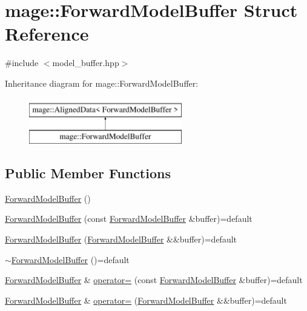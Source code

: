 \hypertarget{structmage_1_1_forward_model_buffer}{}\section{mage\+:\+:Forward\+Model\+Buffer Struct Reference}
\label{structmage_1_1_forward_model_buffer}


{\ttfamily \#include $<$model\+\_\+buffer.\+hpp$>$}

Inheritance diagram for mage\+:\+:Forward\+Model\+Buffer\+:\begin{figure}[H]
\begin{center}
\leavevmode
\includegraphics[height=2.000000cm]{structmage_1_1_forward_model_buffer}
\end{center}
\end{figure}
\subsection*{Public Member Functions}
\begin{DoxyCompactItemize}
\item 
\hyperlink{structmage_1_1_forward_model_buffer_ae9a1629205067c541dcc2d3f1964d8e2}{Forward\+Model\+Buffer} ()
\item 
\hyperlink{structmage_1_1_forward_model_buffer_a12c7548e793781896b51359801e7a274}{Forward\+Model\+Buffer} (const \hyperlink{structmage_1_1_forward_model_buffer}{Forward\+Model\+Buffer} \&buffer)=default
\item 
\hyperlink{structmage_1_1_forward_model_buffer_a5a78b1a5191445413692592e807514af}{Forward\+Model\+Buffer} (\hyperlink{structmage_1_1_forward_model_buffer}{Forward\+Model\+Buffer} \&\&buffer)=default
\item 
\hyperlink{structmage_1_1_forward_model_buffer_ac8785bc5a7d271ee2a39bc0548293984}{$\sim$\+Forward\+Model\+Buffer} ()=default
\item 
\hyperlink{structmage_1_1_forward_model_buffer}{Forward\+Model\+Buffer} \& \hyperlink{structmage_1_1_forward_model_buffer_a45eb0d2963ee6f2948fe2ca9072afb2a}{operator=} (const \hyperlink{structmage_1_1_forward_model_buffer}{Forward\+Model\+Buffer} \&buffer)=default
\item 
\hyperlink{structmage_1_1_forward_model_buffer}{Forward\+Model\+Buffer} \& \hyperlink{structmage_1_1_forward_model_buffer_afa40459d41558ab9daf8172886568461}{operator=} (\hyperlink{structmage_1_1_forward_model_buffer}{Forward\+Model\+Buffer} \&\&buffer)=default
\end{DoxyCompactItemize}
